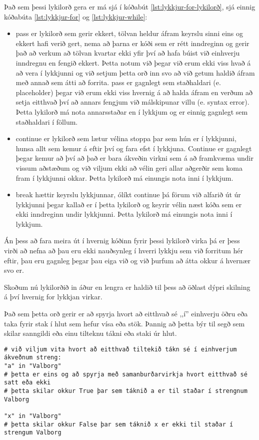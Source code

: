 Það sem þessi lykilorð gera er má sjá í kóðabút \ref{lst:lykkjur-for-lykilorð}, sjá einnig kóðabúta \ref{lst:lykkjur-for} og \ref{lst:lykkjur-while}:
\begin{itemize}
	\item pass er lykilorð sem gerir ekkert, tölvan heldur áfram keyrslu sinni eins og ekkert hafi verið gert, nema að þarna er kóði sem er rétt inndreginn og gerir það að verkum að tölvan kvartar ekki yfir því að hafa búist við einhverju inndregnu en fengið ekkert.
	Þetta notum við þegar við erum ekki viss hvað á að vera í lykkjunni og við setjum þetta orð inn svo að við getum haldið áfram með annað sem átti að forrita.
	pass er gagnlegt sem staðhaldari (e. placeholder) þegar við erum ekki viss hvernig á að halda áfram en verðum að setja eitthvað því að annars fengjum við málskipunar villu (e. syntax error).
	Þetta lykilorð má nota annarsstaðar en í lykkjum og er einnig gagnlegt sem staðhaldari í föllum.
	\item continue er lykilorð sem lætur vélina stoppa þar sem hún er í lykkjunni, hunsa allt sem kemur á eftir því og fara efst í lykkjuna.
	Continue er gagnlegt þegar kemur að því að það er bara ákveðin virkni sem á að framkvæma undir vissum aðstæðum og við viljum ekki að vélin geri allar aðgerðir sem koma fram í lykkjunni okkar.
	Þetta lykilorð má einungis nota inni í lykkjum.
	\item break hættir keyrslu lykkjunnar, ólíkt continue þá förum við alfarið út úr lykkjunni þegar kallað er í þetta lykilorð og keyrir vélin næst kóða sem er ekki inndreginn undir lykkjunni.
	Þetta lykilorð má einungis nota inni í lykkjum.
\end{itemize}

Án þess að fara meira út í hvernig kóðinn fyrir þessi lykilorð virka þá er þess virði að nefna að þau eru ekki nauðsynleg í hverri lykkju sem við forritum hér eftir, þau eru gagnleg þegar þau eiga við og við þurfum að átta okkur á hvernær svo er.

Skoðum nú lykilorðið in áður en lengra er haldið til þess að öðlast dýpri skilning á því hvernig for lykkjan virkar.

Það sem þetta orð gerir er að spyrja hvort að eitthvað sé ,,í'' einhverju öðru eða taka fyrir stak í hlut sem hefur vísa eða stök.
Þannig að þetta býr til segð sem skilar sanngildi eða einu tilteknu tákni eða staki úr hlut.

\begin{lstlisting}[caption=Lykilorðið in, label=lst:lykkjur-in]
# við viljum vita hvort að eitthvað tiltekið tákn sé í einhverjum ákveðnum streng:
"a" in "Valborg"
# þetta er eins og að spyrja með samanburðarvirkja hvort eitthvað sé satt eða ekki
# þetta skilar okkur True þar sem táknið a er til staðar í strengnum Valborg

"x" in "Valborg"
# þetta skilar okkur False þar sem táknið x er ekki til staðar í strengum Valborg
\end{lstlisting}

